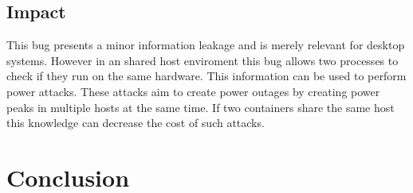 \documentclass[10pt,twocolumn,a4paper]{article}
\begin{document}
\subsection{Impact}
This bug presents a minor information leakage and is merely relevant for desktop systems.
However in an shared host enviroment this bug allows two processes to check if they run on the same
hardware. This information can be used to perform power attacks. These attacks aim to create power
outages by creating power peaks in multiple hosts at the same time. If two containers share the same
host this knowledge can decrease the cost of such attacks\cite{7}.
\section{Conclusion}\label{sec:conclusion}



\end{document}
